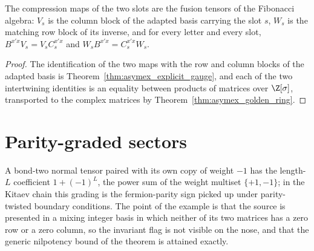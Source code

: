 \begin{theorem}
    \label{thm:asymex_fib_fusion_tensors}
    \leanok
    The compression maps of the two slots are the fusion tensors of the
    Fibonacci algebra: $V_s$ is the column block of the adapted basis
    carrying the slot $s$, $W_s$ is the matching row block of its inverse,
    and for every letter and every slot,
    $B^{x'x}V_s=V_sC_s^{x'x}$ and $W_sB^{x'x}=C_s^{x'x}W_s$.
\end{theorem}

\begin{proof}
    \leanok
    The identification of the two maps with the row and column blocks of
    the adapted basis is Theorem~\ref{thm:asymex_explicit_gauge}, and each
    of the two intertwining identities is an equality between products of
    matrices over $\Z[\sigma]$, transported to the complex matrices by
    Theorem~\ref{thm:asymex_golden_ring}.
\end{proof}

\section{Parity-graded sectors}%
\label{sec:asymex_parity}

A bond-two normal tensor paired with its own copy of weight $-1$ has the
length-$L$ coefficient $1+(-1)^L$, the power sum of the weight multiset
$\{+1,-1\}$; in the Kitaev chain this grading is the fermion-parity sign
picked up under parity-twisted boundary conditions. The point of the
example is that the source is presented in a mixing integer basis in which
neither of its two matrices has a zero row or a zero column, so the
invariant flag is not visible on the nose, and that the generic nilpotency
bound of the theorem is attained exactly.

